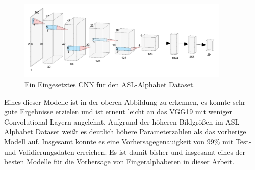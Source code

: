 \documentclass[11pt,bibliography=totocnumbered]{scrartcl}
\begin{document}
\begin{figure}[H]
	\centering
	\includegraphics[width=0.90\textwidth]{cnn_used_kaggle_2}
	\vspace*{-3mm}
	\caption[Eingesetztes CNN für den ASL-Alphabet Dataset]{Ein Eingesetztes CNN für den ASL-Alphabet Dataset.}
	\label{fig:cnn_used_kaggle_2}
\end{figure}
\vspace*{-5mm}
Eines dieser Modelle ist in der oberen Abbildung zu erkennen, es konnte sehr gute Ergebnisse erzielen und ist erneut leicht an das VGG19 mit weniger Convolutional Layern angelehnt. Aufgrund der höheren Bildgrößen im ASL-Alphabet Dataset weißt es deutlich höhere Parameterzahlen als das vorherige Modell auf. Insgesamt konnte es eine Vorhersagegenauigkeit von 99\% mit Test- und Validierungsdaten erreichen. Es ist damit bisher und insgesamt eines der besten Modelle für die Vorhersage von Fingeralphabeten in dieser Arbeit.
\end{document}
